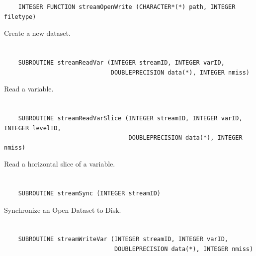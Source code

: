 \begin{verbatim}
    INTEGER FUNCTION streamOpenWrite (CHARACTER*(*) path, INTEGER filetype)
\end{verbatim}

Create a new dataset.


\section*{\tt {}}

\begin{verbatim}
    SUBROUTINE streamReadVar (INTEGER streamID, INTEGER varID,
                              DOUBLEPRECISION data(*), INTEGER nmiss)
\end{verbatim}

Read a variable.


\section*{\tt {}}

\begin{verbatim}
    SUBROUTINE streamReadVarSlice (INTEGER streamID, INTEGER varID, INTEGER levelID,
                                   DOUBLEPRECISION data(*), INTEGER nmiss)
\end{verbatim}

Read a horizontal slice of a variable.


\section*{\tt {}}

\begin{verbatim}
    SUBROUTINE streamSync (INTEGER streamID)
\end{verbatim}

Synchronize an Open Dataset to Disk.


\section*{\tt {}}

\begin{verbatim}
    SUBROUTINE streamWriteVar (INTEGER streamID, INTEGER varID,
                               DOUBLEPRECISION data(*), INTEGER nmiss)
\end{verbatim}

